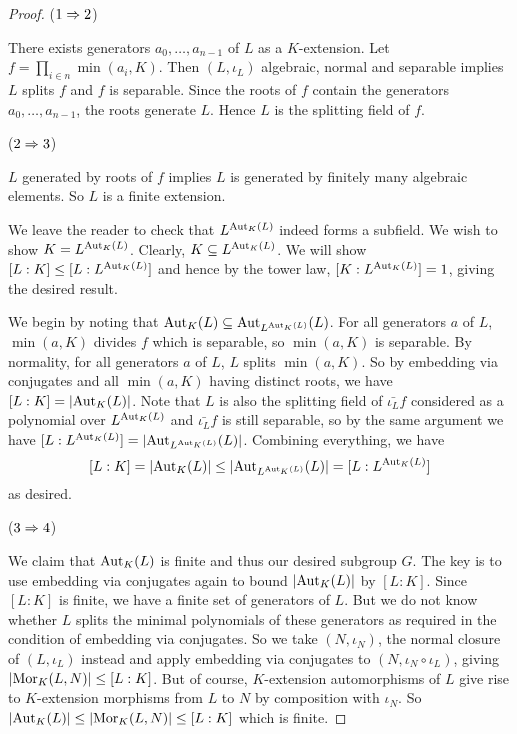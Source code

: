 \documentclass[../book.tex]{subfiles}
\begin{document}
\begin{proof}
    ($1\Rightarrow 2$)
        
        There exists generators $a_0,\dots,a_{n-1}$ of $L$ as a $K$-extension.
        Let $f = \prod_{i\in n} \min(a_i,K)$. 
        Then $(L,\iota_L)$ algebraic, normal and separable implies 
        $L$ splits $f$ and $f$ is separable.
        Since the roots of $f$ contain the generators $a_0,\dots,a_{n-1}$,
        the roots generate $L$. Hence $L$ is the splitting field of $f$.
        
    ($2\Rightarrow 3$)
        
        $L$ generated by roots of $f$ implies 
        $L$ is generated by finitely many algebraic elements.
        So $L$ is a finite extension. 
        
        We leave the reader to check that $L^{\text{Aut}_{K}(L)}$ indeed forms a subfield. 
        We wish to show $K = L^{\text{Aut}_{K}(L)}$. 
        Clearly, $K \subseteq L^{\text{Aut}_{K}(L)}$.
        We will show $[L : K] \leq [L : L^{\text{Aut}_{K}(L)}]$ and hence
        by the tower law, $[K : L^{\text{Aut}_{K}(L)}] = 1$, giving the desired result.
        
        We begin by noting that $\text{Aut}_{K}(L) \subseteq \text{Aut}_{L^{\text{Aut}_{K}(L)}}(L)$.
        For all generators $a$ of $L$, 
        $\min(a,K)$ divides $f$ which is separable, so $\min(a,K)$ is separable. 
        By normality, for all generators $a$ of $L$, $L$ splits $\min(a,K)$.
        So by embedding via conjugates and all $\min(a,K)$ having distinct roots,
        we have $[L : K] = |\text{Aut}_{K}(L)|$.
        Note that $L$ is also the splitting field of 
        $\bar{\iota_L} f$ considered as a polynomial over $L^{\text{Aut}_{K}(L)}$
        and $\bar{\iota_L} f$ is still separable,
        so by the same argument we have 
        $[L : L^{\text{Aut}_{K}(L)}] = |\text{Aut}_{L^{\text{Aut}_{K}(L)}}(L)|$. 
        Combining everything, we have \[
            [L : K] = |\text{Aut}_{K}(L)| 
            \leq |\text{Aut}_{L^{\text{Aut}_{K}(L)}}(L)| = [L : L^{\text{Aut}_{K}(L)}]
        \]
        as desired. 
        
    ($3\Rightarrow 4$)
        
        We claim that $\text{Aut}_{K}(L)$ is finite and thus our desired subgroup $G$. 
        The key is to use embedding via conjugates again to bound 
        $|\text{Aut}_{K}(L)|$ by $[L : K]$. 
        Since $[L : K]$ is finite, we have a finite set of generators of $L$.
        But we do not know whether $L$ splits 
        the minimal polynomials of these generators as required in the condition
        of embedding via conjugates. 
        So we take $(N,\iota_N)$, the normal closure of $(L,\iota_L)$ instead
        and apply embedding via conjugates to $(N,\iota_N\circ\iota_L)$,
        giving $|\text{Mor}_{K}(L, N)| \leq [L : K]$.
        But of course, $K$-extension automorphisms of $L$ give rise to 
        $K$-extension morphisms from $L$ to $N$ by composition with $\iota_N$.
        So $|\text{Aut}_{K}(L)| \leq |\text{Mor}_{K}(L, N)| \leq [L : K]$ which is finite. 
        

\end{proof}
\end{document}
